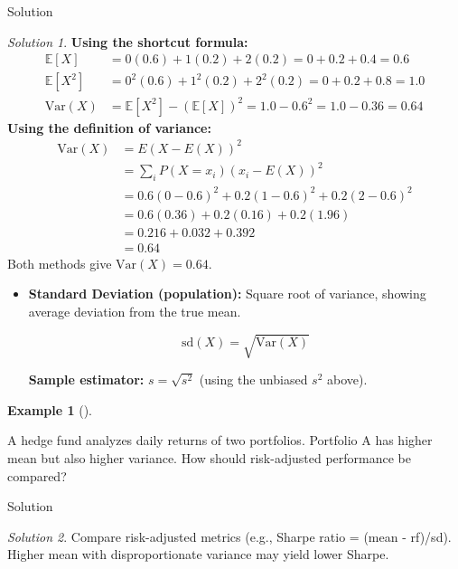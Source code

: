 \documentclass[
  12pt,
  a4paper,
]{scrbook}
\theoremstyle{plain}
\theoremstyle{definition}
\newtheorem{example}{Example}[chapter]
\theoremstyle{remark}
\newtheorem{refsolution}{Solution}[chapter]
\begin{document}
Solution

\begin{refsolution}
\textbf{Using the shortcut formula:} \[
\begin{split}
\mathbb{E}[X] &= 0(0.6)+1(0.2)+2(0.2)=0+0.2+0.4=0.6 \\
\mathbb{E}[X^2] &= 0^2(0.6)+1^2(0.2)+2^2(0.2)=0+0.2+0.8=1.0 \\
\text{Var}(X) &= \mathbb{E}[X^2] - (\mathbb{E}[X])^2 = 1.0 - 0.6^2 = 1.0 - 0.36 = 0.64
\end{split}
\] \textbf{Using the definition of variance:} \[
\begin{split}
\text{Var}(X) &= E(X-E(X))^2 \\
&= \sum_i P(X=x_i)(x_i-E(X))^2 \\
&= 0.6(0-0.6)^2 + 0.2(1-0.6)^2 + 0.2(2-0.6)^2 \\
&= 0.6(0.36) + 0.2(0.16) + 0.2(1.96) \\
&= 0.216 + 0.032 + 0.392 \\
&= 0.64 
\end{split}
\] Both methods give \(\text{Var}(X)=0.64\).

\label{sol-10}

\end{refsolution}

\begin{itemize}
\item
  \textbf{Standard Deviation (population):} Square root of variance,
  showing average deviation from the true mean.

  \[\text{sd}(X) = \sqrt{\text{Var}(X)}\]

  \textbf{Sample estimator:} \(s = \sqrt{s^2}\) (using the unbiased
  \(s^2\) above).
\end{itemize}

\begin{example}[]\protect\hypertarget{exm-9}{}\label{exm-9}

A hedge fund analyzes daily returns of two portfolios. Portfolio A has
higher mean but also higher variance. How should risk-adjusted
performance be compared?

\end{example}

Solution

\begin{refsolution}
\leavevmode

Compare risk-adjusted metrics (e.g., Sharpe ratio = (mean - rf)/sd).
Higher mean with disproportionate variance may yield lower Sharpe.

\label{sol-9}

\end{refsolution}
\end{document}
